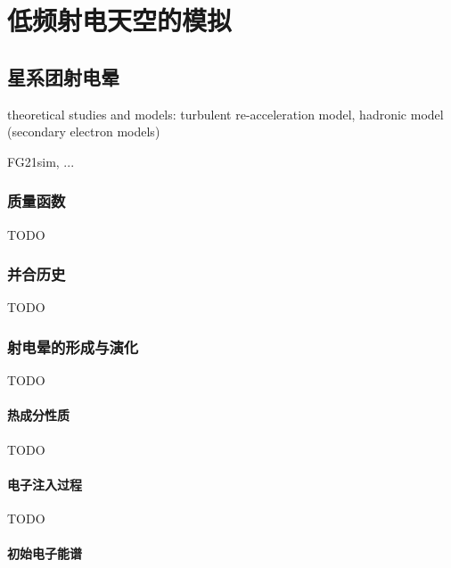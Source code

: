 \chapter{低频射电天空的模拟}
\label{chap:simulation}

\section{星系团射电晕}
\label{sec:radio-halos}

theoretical studies and models:
turbulent re-acceleration model,
hadronic model (secondary electron models)

FG21sim, ...

\subsection{质量函数}

TODO

\subsection{并合历史}

TODO

\subsection{射电晕的形成与演化}

TODO

\subsubsection{热成分性质}

TODO

\subsubsection{电子注入过程}

TODO

\subsubsection{初始电子能谱}

